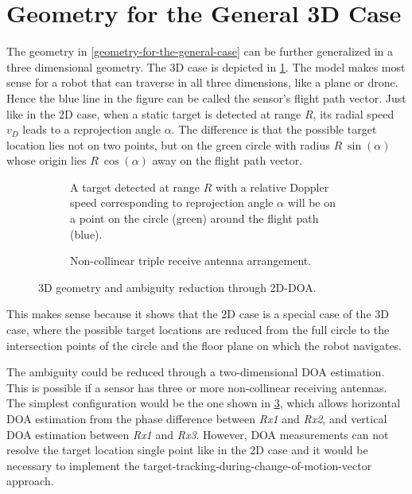 \section{Geometry for the General 3D Case}\label{geometry-for-the-3d-case}

The geometry in \cref{geometry-for-the-general-case} can be further generalized in a three dimensional geometry. The 3D case is depicted in \cref{fig:3dcase}. The model makes most sense for a robot that can traverse in all three dimensions, like a plane or drone. Hence the blue line in the figure can be called the sensor's flight path vector. Just like in the 2D case, when a static target is detected at range $R$, its radial speed $v_D$ leads to a reprojection angle $\alpha$. The difference is that the possible target location lies not on two points, but on the green circle with radius $R~\sin(\alpha)$ whose origin lies $R~\cos(\alpha)$ away on the flight path vector.

\begin{figure}[htp]
    \begin{subfigure}[t]{.475\textwidth}
        \centering
        \def\svgwidth{5cm}
        
        \caption{A target detected at range \(R\) with a relative Doppler speed corresponding to reprojection angle \(\alpha\) will be on a point on the circle (green) around the flight path (blue).}
        \label{fig:3dcase}
    \end{subfigure}%
    \hfill%
    \begin{subfigure}[t]{.475\textwidth}
        \centering
        \def\svgwidth{5cm}
        
        \caption{Non-collinear triple receive antenna arrangement.}
        \label{fig:2ddoa}
    \end{subfigure}
    \caption{3D geometry and ambiguity reduction through 2D-DOA.}
\end{figure}

This makes sense because it shows that the 2D case is a special case of the 3D case, where the possible target locations are reduced from the full circle to the intersection points of the circle and the floor plane on which the robot navigates.

The ambiguity could be reduced through a two-dimensional DOA estimation. This is possible if a sensor has three or more non-collinear receiving antennas. The simplest configuration would be the one shown in \cref{fig:2ddoa}, which allows horizontal DOA estimation from the phase difference between \textit{Rx1} and \textit{Rx2}, and vertical DOA estimation between \textit{Rx1} and \textit{Rx3}. However, DOA measurements can not resolve the target location single point like in the 2D case and it would be necessary to implement the target-tracking-during-change-of-motion-vector approach.


